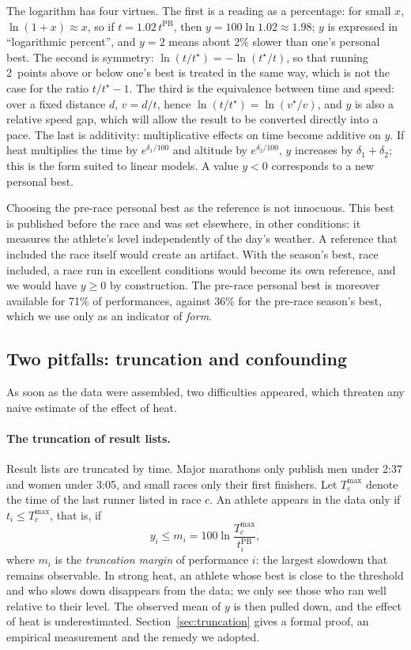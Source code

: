\documentclass[11pt,a4paper]{article}
\newcommand{\PB}{\mathrm{PB}}
\begin{document}
The logarithm has four virtues. The first is a reading as a percentage: for small $x$, $\ln(1 + x) \approx x$, so if
$t = 1.02\,t^{\PB}$, then $y = 100 \ln 1.02 \approx 1.98$; $y$ is expressed in ``logarithmic percent'', and $y = 2$
means about 2\% slower than one's personal best. The second is symmetry: $\ln(t/t^\star) = -\ln(t^\star/t)$, so that
running 2~points above or below one's best is treated in the same way, which is not the case for the ratio
$t/t^\star - 1$. The third is the equivalence between time and speed: over a fixed distance $d$, $v = d/t$, hence
$\ln(t/t^\star) = \ln(v^\star/v)$, and $y$ is also a relative speed gap, which will allow the result to be converted
directly into a pace. The last is additivity: multiplicative effects on time become additive on $y$. If heat
multiplies the time by $e^{\delta_1/100}$ and altitude by $e^{\delta_2/100}$, $y$ increases by $\delta_1 + \delta_2$;
this is the form suited to linear models. A value $y < 0$ corresponds to a new personal best.

Choosing the pre-race personal best as the reference is not innocuous. This best is published before the race and was
set elsewhere, in other conditions: it measures the athlete's level independently of the day's weather. A reference
that included the race itself would create an artifact. With the season's best, race included, a race run in
excellent conditions would become its own reference, and we would have $y \geq 0$ by construction. The pre-race
personal best is moreover available for 71\% of performances, against 36\% for the pre-race season's best, which we
use only as an indicator of \emph{form}.

\subsection{Two pitfalls: truncation and confounding}\label{sec:pitfalls}

As soon as the data were assembled, two difficulties appeared, which threaten any naive estimate of the effect of
heat.

\paragraph{The truncation of result lists.} Result lists are truncated by time. Major marathons only publish men
under 2:37 and women under 3:05, and small races only their first finishers. Let $T^{\max}_c$ denote the time of the
last runner listed in race $c$. An athlete appears in the data only if $t_i \le T^{\max}_c$, that is, if
\[
y_i \leq m_i = 100 \ln \frac{T_c^{\max}}{t_i^{\PB}} ,
\]
where $m_i$ is the \emph{truncation margin} of performance $i$: the largest slowdown that remains observable. In strong
heat, an athlete whose best is close to the threshold and who slows down disappears from the data; we only see those
who ran well relative to their level. The observed mean of $y$ is then pulled down, and the effect of heat is
underestimated. Section~\ref{sec:truncation} gives a formal proof, an empirical measurement and the remedy we
adopted.
\end{document}

